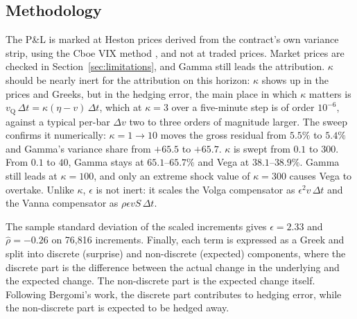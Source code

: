 \documentclass[11pt]{article}
\begin{document}


\subsection{Methodology}
\label{sec:methodology}

The P\&L is marked at Heston prices derived from the contract's own variance strip, using the Cboe VIX method \cite{cboemath}, and not at traded prices. Market prices are checked in Section~\ref{sec:limitations}, and Gamma still leads the attribution.
$\kappa$ should be nearly inert for the attribution on this horizon: $\kappa$ shows up in the prices and Greeks, but in the hedging error, the main place in which $\kappa$ matters is $v_{\mathrm{Q}}\,\Delta t = \kappa(\eta - v)\,\Delta t$, which at $\kappa = 3$ over a five-minute step is of order $10^{-6}$, against a typical per-bar $\Delta v$ two to three orders of magnitude larger.
The sweep confirms it numerically: $\kappa = 1 \to 10$ moves the gross residual from $5.5\%$ to $5.4\%$ and Gamma's variance share from $+65.5$ to $+65.7$. $\kappa$ is swept from $0.1$ to $300$. From $0.1$ to $40$, Gamma stays at $65.1$--$65.7\%$ and Vega at $38.1$--$38.9\%$. Gamma still leads at $\kappa = 100$, and only an extreme shock value of $\kappa = 300$ causes Vega to overtake.
Unlike $\kappa$, $\epsilon$ is not inert: it scales the Volga compensator as $\epsilon^2 v\,\Delta t$ and the Vanna compensator as $\rho\epsilon v S\,\Delta t$.

The sample standard deviation of the scaled increments gives $\hat{\epsilon} = 2.33$ and $\hat{\rho} = -0.26$ on 76,816 increments.
Finally, each term is expressed as a Greek and split into discrete (surprise) and non-discrete (expected) components, where the discrete part is the difference between the actual change in the underlying and the expected change.
The non-discrete part is the expected change itself.
Following Bergomi's work, the discrete part contributes to hedging error, while the non-discrete part is expected to be hedged away.
\end{document}
